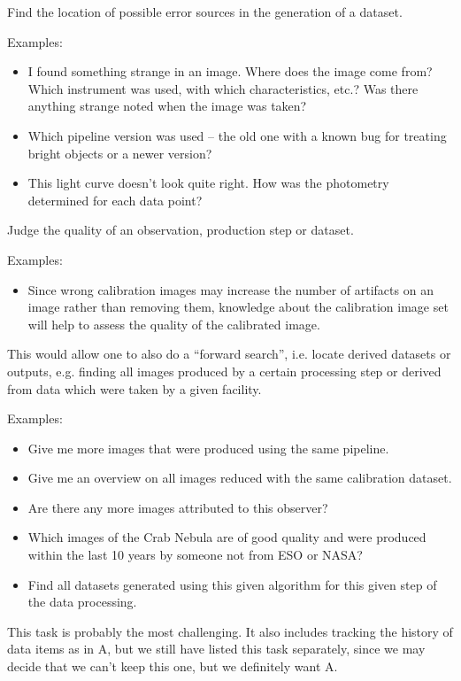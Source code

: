         Find the location of possible error sources in the generation of a dataset.

        \noindent Examples:
        \begin{itemize}
            \item I found something strange in an image. Where does
the image come from? Which instrument was used, with which characteristics,
etc.? Was there anything strange noted when the image was taken?  
            \item Which pipeline version was used -- the old one
with a known bug for treating bright objects or a newer version?  
            \item This light curve doesn't look quite right. How was
the photometry determined for each data point?  
        \end{itemize}


        Judge the quality of an observation, production step or dataset.
        
        \noindent Examples:
        \begin{itemize}
            \item Since wrong calibration images may increase the
number of artifacts on an image rather than removing them, knowledge about
the calibration image set will help to assess the quality of the calibrated
image.  
        \end{itemize}
      

        This would allow one to also do a ``forward search'', i.e. locate derived datasets or outputs, e.g. finding all images produced by a certain processing step or derived from data which were taken by a given facility.
        
        \noindent Examples:
        \begin{itemize}
            \item Give me more images that were produced using the same pipeline.  
            \item Give me an overview on all images reduced with the same calibration dataset.  
            \item Are there any more images attributed to this observer?  
            \item Which images of the Crab Nebula are of good quality and were produced within the last 10 years by someone not from ESO or NASA?
            \item Find all datasets generated using this given algorithm for this given step of the data processing.
        \end{itemize}

        This task is probably the most challenging. It also includes tracking the history of data items as in A, but we still have listed this task separately, since we may decide that we can't keep this one, but we definitely want A.
